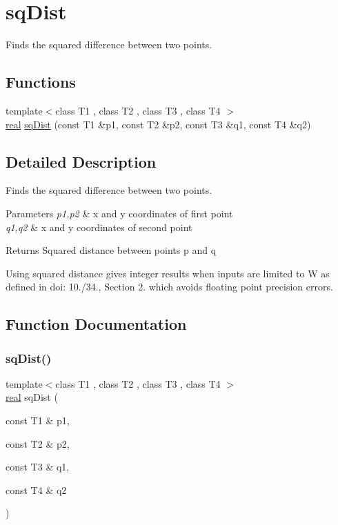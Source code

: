 \hypertarget{group__sqDist}{}\section{sq\+Dist}
\label{group__sqDist}


Finds the squared difference between two points.  


\subsection*{Functions}
\begin{DoxyCompactItemize}
\item 
{\footnotesize template$<$class T1 , class T2 , class T3 , class T4 $>$ }\\\mbox{\hyperlink{typedefs_8h_a58a0c7cf2501f4492da833421be92547}{real}} \mbox{\hyperlink{group__sqDist_ga1825deef099379c7bf2f3f628b6a2079}{sq\+Dist}} (const T1 \&p1, const T2 \&p2, const T3 \&q1, const T4 \&q2)
\end{DoxyCompactItemize}


\subsection{Detailed Description}
Finds the squared difference between two points. 


\begin{DoxyParams}{Parameters}
{\em p1,p2} & x and y coordinates of first point \\
\hline
{\em q1,q2} & x and y coordinates of second point \\
\hline
\end{DoxyParams}
\begin{DoxyReturn}{Returns}
Squared distance between points p and q
\end{DoxyReturn}
Using squared distance gives integer results when inputs are limited to W as defined in doi\+: 10./34., Section 2. which avoids floating point precision errors. 

\subsection{Function Documentation}
\mbox{\label{group__sqDist_ga1825deef099379c7bf2f3f628b6a2079}} 
\subsubsection{\texorpdfstring{sq\+Dist()}{sqDist()}}
{\footnotesize\ttfamily template$<$class T1 , class T2 , class T3 , class T4 $>$ \\
\mbox{\hyperlink{typedefs_8h_a58a0c7cf2501f4492da833421be92547}{real}} sq\+Dist (\begin{DoxyParamCaption}\item[{const T1 \&}]{p1,  }\item[{const T2 \&}]{p2,  }\item[{const T3 \&}]{q1,  }\item[{const T4 \&}]{q2 }\end{DoxyParamCaption})}

